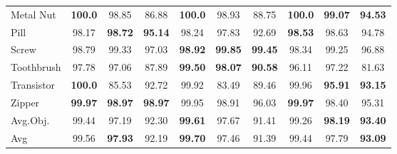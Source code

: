 \begin{table}[t]
{\begin{tabular}{@{}l|ccc|ccc|ccc@{}}
Metal Nut & \textbf{100.0} & 98.85 & 86.88 & \textbf{100.0} & 98.93 & 88.75 & \textbf{100.0} & \textbf{99.07} & \textbf{94.53} \\
Pill & 98.17 & \textbf{98.72} & \textbf{95.14} & 98.24 & 97.83 & 92.69 & \textbf{98.53} & 98.63 & 94.78 \\
Screw & 98.79 & 99.33 & 97.03 & \textbf{98.92} & \textbf{99.85} & \textbf{99.45} & 98.34 & 99.25 & 96.88 \\
Toothbrush & 97.78 & 97.06 & 87.89 & \textbf{99.50} & \textbf{98.07} & \textbf{90.58} & 96.11 & 97.22 & 81.63 \\
Transistor & \textbf{100.0} & 85.53 & 92.72 & 99.92 & 83.49 & 89.46 & 99.96 & \textbf{95.91} & \textbf{93.15} \\
Zipper & \textbf{99.97} & \textbf{98.97} & \textbf{98.97} & 99.95 & 98.91 & 96.03 & \textbf{99.97} & 98.40 & 95.31 \\
\hline
\midrule
Avg.Obj. & 99.44 & 97.19 & 92.30 & \textbf{99.61} & 97.67 & 91.41 & 99.26 & \textbf{98.19} & \textbf{93.40} \\
\hline
\midrule
Avg & 99.56 & \textbf{97.93} & 92.19 & \textbf{99.70} & 97.46 & 91.39 & 99.44 & 97.79 & \textbf{93.09} \\
\bottomrule
\hline
\end{tabular}
}
\end{table}
